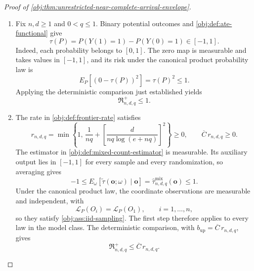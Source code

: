 \begin{proof}[Proof of \cref{obj:thm:unrestricted-near-complete-arrival-envelope}]
\begin{enumerate}
\item Fix \(n,d\ge1\) and \(0<q\le1\). Binary potential outcomes and
\cref{obj:def:ate-functional} give
\[
\tau(P)=P(Y(1)=1)-P(Y(0)=1)\in[-1,1].
\]
Indeed, each probability belongs to \([0,1]\). The zero map is measurable and takes values in \([-1,1]\), and its risk under the canonical product probability law is
\[
E_P\!\left[(0-\tau(P))^2\right]=\tau(P)^2\le1.
\]
Applying the deterministic comparison just established yields
\[
\mathfrak R^{+}_{n,d,q}\le1.
\]

\item The rate in \cref{obj:def:frontier-rate} satisfies
\[
r_{n,d,q}
=
\min\left\{
1,\,
\frac1{nq}
+
\left[\frac{d}{nq\log(e+nq)}\right]^2
\right\}\ge0,
\qquad
\overline C\,r_{n,d,q}\ge0.
\]
The estimator in \cref{obj:def:mixed-count-estimator} is measurable. Its auxiliary output lies in \([-1,1]\) for every sample and every randomization, so averaging gives
\[
-1
\le
E_\omega\!\left[
\widetilde\tau(\mathbf o;\omega)\mid\mathbf o
\right]
=
\widehat\tau^{\mathrm{mix}}_{n,d,q}(\mathbf o)
\le1.
\]
Under the canonical product law, the coordinate observations are measurable and independent, with
\[
\mathcal L_P(O_i)=\mathcal L_P(O_1),
\qquad i=1,\ldots,n,
\]
so they satisfy \cref{obj:ass:iid-sampling}. The first step therefore applies to every law in the model class. The deterministic comparison, with \(b_{\mathrm{up}}=\overline C\,r_{n,d,q}\), gives
\[
\mathfrak R^{+}_{n,d,q}\le\overline C\,r_{n,d,q}.
\]


\end{enumerate}
\end{proof}

